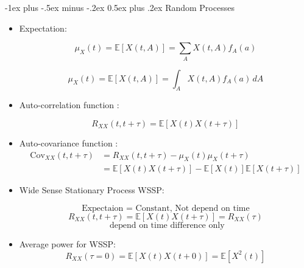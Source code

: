 \documentclass[a4paper]{article}
\makeatletter
\renewcommand{\section}{\@startsection{section}{1}{0mm}%
                                {-1ex plus -.5ex minus -.2ex}%
                                {0.5ex plus .2ex}%
                                {\normalfont\large\bfseries}}
\makeatother
\begin{document}
\begin{multicols}{3}
\begin{itemize}
\end{itemize}
\section{Random Processes}

\begin{itemize}
\item  Expectation:

$$ \mu_X(t) = \mathbb{E}[X(t,A)] = \sum_A X(t,A)f_A(a) $$

$$ \mu_X(t) = \mathbb{E}[X(t,A)] = \int_A X(t,A)f_A(a)\,dA $$

\item Auto-correlation function :

$$ R_{XX}(t,t+\tau) = \mathbb{E}[X(t)X(t+\tau)] $$

\item Auto-covariance function :
\begin{align*}
 \text{Cov}_{XX}(t,t+\tau) &= R_{XX}(t,t+\tau) - \mu_{X}(t) \mu_{X}(t+\tau)\\
 &=\mathbb{E}[X(t)X(t+\tau)]    -\mathbb{E}[X(t)] \mathbb{E}[X(t+\tau)] 
\end{align*}

\item Wide Sense Stationary Process WSSP:

$$\text{Expectaion = Constant, Not depend on time}$$
$$ R_{XX}(t,t+\tau) = \mathbb{E}[X(t)X(t+\tau)]= R_{XX}(\tau)$$
$$\text{ depend on time difference only}$$



\item Average power for WSSP:
$$ R_{XX}(\tau = 0) = \mathbb{E}[X(t)X(t+0)] = \mathbb{E}[X^2(t)]  $$


\end{itemize}
\end{multicols}
\end{document}
